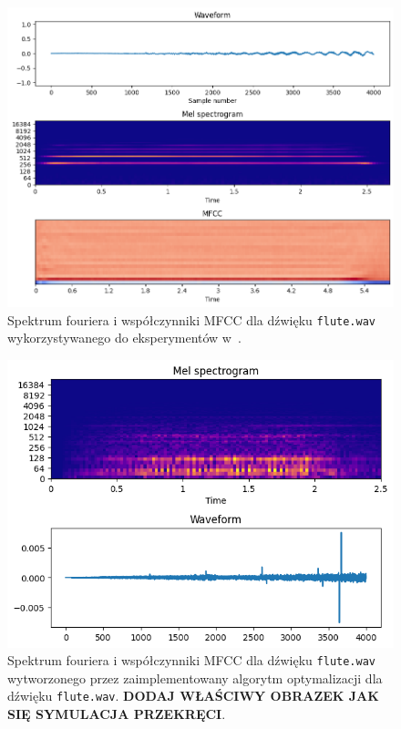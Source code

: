 \begin{multicols}{3}
\begin{figure}[H]
    \centering
    \includegraphics[width=0.9\linewidth]{rys06/target_sample_flute_literature.png}
    \caption{
      Spektrum fouriera i współczynniki MFCC dla dźwięku \texttt{flute.wav} wykorzystywanego
      do eksperymentów w~\cite{evolutionary_puredata_results}.
    }\label{fig:literature_flute_sound_overview}
\end{figure}

\begin{figure}[H]
    \centering
    \includegraphics[width=0.9\linewidth]{rys06/evolved_sample_flute.png}
    \caption{
      Spektrum fouriera i współczynniki MFCC dla dźwięku \texttt{flute.wav}
      wytworzonego przez zaimplementowany algorytm optymalizacji
      dla dźwięku \texttt{flute.wav}. \textbf{DODAJ WŁAŚCIWY OBRAZEK JAK SIĘ SYMULACJA PRZEKRĘCI}.
    }\label{fig:evolved_flute_sound_overview}
\end{figure}


\end{multicols}
